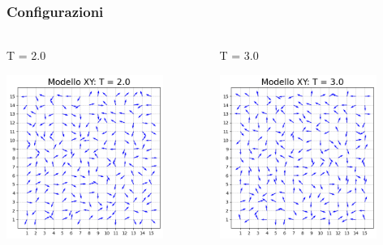 \begin{frame}
    \frametitle{Configurazioni}
    \framesubtitle{}

    \begin{columns}
        \begin{column}{0.5\textwidth}
            \begin{block}{T = 2.0}

            \centering
            \includegraphics[width=0.8\textwidth]{Immagini/backupXY/conf_T2.0.png}

            \end{block}
        \end{column}
    
        \begin{column}{0.5\textwidth}
            \begin{block}{T = 3.0}

                \centering
                \includegraphics[width=0.8\textwidth]{Immagini/backupXY/conf_T3.0.png}


\end{block}
\end{column}
\end{columns}
\end{frame}
